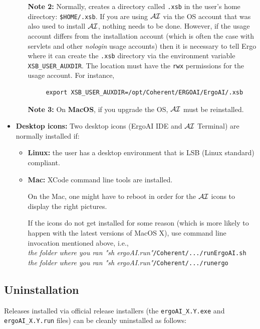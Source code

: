 \documentclass[11pt]{article}
\newcommand{\ERGO}{\mbox{\smaller{\ensuremath{\cal{E}}\smaller{{\sc{RGO}}}}}\xspace}
\newcommand{\ERGOAI}{\mbox{\smaller{\ensuremath{\cal{E}}\smaller{{\sc{RGO}}}}\ensuremath{\cal{AI}}}\xspace}
\begin{document}
\begin{itemize}
\begin{itemize}
    \textbf{Note 2:} Normally, \ERGO creates a directory called
    \texttt{.xsb} in the user's home directory: \texttt{\$HOME/.xsb}. If
    you are using \ERGOAI via the OS account that was also used to install
    \ERGOAI, nothing needs to be done. However, if the usage account differs
    from the installation account (which is often the case with servlets
    and other \emph{nologin} usage accounts) then it is necessary to tell
    Ergo where it can create the \texttt{.xsb} directory via the
    environment variable \texttt{XSB\_USER\_AUXDIR}. The location must have
    the \texttt{rwx} permissions for the usage account. For instance,
\begin{verbatim}
     export XSB_USER_AUXDIR=/opt/Coherent/ERGOAI/ErgoAI/.xsb 
\end{verbatim}
    \textbf{Note 3:} On \textbf{MacOS}, if you upgrade the OS, \ERGOAI must be
    reinstalled.
  \end{itemize}
\item[] \textbf{Desktop icons:} Two desktop icons (ErgoAI IDE and \ERGOAI
  Terminal) are normally installed if:
    \begin{itemize}
    \item[] \textbf{Linux:} the user has a desktop environment that is LSB
      (Linux standard) compliant.
    \item[] \textbf{Mac:}  XCode command line tools are installed.

      On the Mac, one might have to reboot in order for the \ERGOAI icons to
      display the right pictures.

      If the icons do not get installed for some reason (which is more
      likely to happen with the latest versions of MacOS X), use command
      line invocation mentioned above, i.e.,
      \\
      \emph{the folder where you ran "sh ergoAI.run"}\texttt{/Coherent/.../runErgoAI.sh}
      \\
      \emph{the folder where you ran "sh ergoAI.run"}\texttt{/Coherent/.../runergo} 
    \end{itemize}
\end{itemize}

\subsection{Uninstallation}\label{sec-uninstall}

Releases installed via official release installers (the
\texttt{ergoAI\_X.Y.exe} and \texttt{ergoAI\_X.Y.run}  files)
can be cleanly uninstalled as follows:
\end{document}
